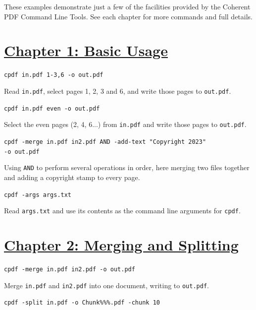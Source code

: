 \documentclass{book}
\begin{document}
These examples demonstrate just a few of the facilities provided by the Coherent PDF Command Line Tools. See each chapter for more commands and full details.

\section*{\hyperref[chap:1]{Chapter 1: Basic Usage}}

\begin{framed}\noindent\texttt{cpdf in.pdf 1-3,6 -o out.pdf}\end{framed}

\noindent Read \texttt{in.pdf}, select pages 1, 2, 3 and 6, and write those pages to \texttt{out.pdf}.


\begin{framed}\noindent\texttt{cpdf in.pdf even -o out.pdf}\end{framed}
                  
\noindent Select the even pages (2, 4, 6...) from \texttt{in.pdf} and write those pages to \texttt{out.pdf}.

\begin{framed}\noindent\texttt{cpdf -merge in.pdf in2.pdf AND -add-text "Copyright 2023"\\\phantom{\ \ \ \ } -o out.pdf}\end{framed}

\noindent Using \texttt{AND} to perform several operations in order, here merging two files together and adding a copyright stamp to every page.

\begin{framed}\noindent\texttt{cpdf -args args.txt}\end{framed}

\noindent Read \texttt{args.txt} and use its contents as the command line arguments for \texttt{cpdf}.

\section*{\hyperref[chap:2]{Chapter 2: Merging and Splitting}}

\begin{framed}\noindent\texttt{cpdf -merge in.pdf in2.pdf -o out.pdf}\end{framed}

\noindent Merge \texttt{in.pdf} and \texttt{in2.pdf} into one document, writing to \texttt{out.pdf}.

\begin{framed}\noindent\texttt{cpdf -split in.pdf -o Chunk\%\%\%.pdf -chunk 10}\end{framed}
\end{document}
